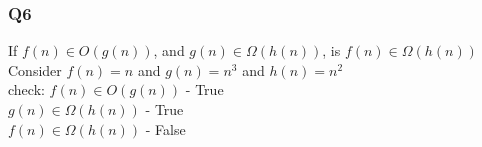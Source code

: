 \documentclass[12pt]{article}
\begin{document}
	\subsubsection*{Q6}
	If $f(n) \in O(g(n))$, and $g(n) \in \Omega(h(n))$, is $f(n) \in \Omega(h(n))$\\
	
	Consider $f(n) = n$ and $g(n) = n^3$ and $h(n) = n^2$\\
	check: $f(n) \in O(g(n))$ - True \\
	$g(n) \in \Omega(h(n))$ - True\\
	$f(n) \in \Omega(h(n))$ - False\\
	
	
	
\end{document}
